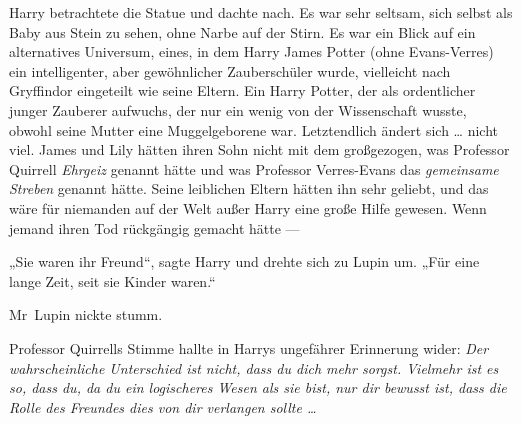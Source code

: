 Harry betrachtete die Statue und dachte nach. Es war sehr seltsam, sich selbst als Baby aus Stein zu sehen, ohne Narbe auf der Stirn. Es war ein Blick auf ein alternatives Universum, eines, in dem Harry James Potter (ohne Evans-Verres) ein intelligenter, aber gewöhnlicher Zauberschüler wurde, vielleicht nach Gryffindor eingeteilt wie seine Eltern. Ein Harry Potter, der als ordentlicher junger Zauberer aufwuchs, der nur ein wenig von der Wissenschaft wusste, obwohl seine Mutter eine Muggelgeborene war. Letztendlich ändert sich … nicht viel. James und Lily hätten ihren Sohn nicht mit dem großgezogen, was Professor Quirrell \emph{Ehrgeiz} genannt hätte und was Professor Verres-Evans das \emph{gemeinsame Streben} genannt hätte. Seine leiblichen Eltern hätten ihn sehr geliebt, und das wäre für niemanden auf der Welt außer Harry eine große Hilfe gewesen. Wenn jemand ihren Tod rückgängig gemacht hätte —

„Sie waren ihr Freund“, sagte Harry und drehte sich zu Lupin um.
„Für eine lange Zeit, seit sie Kinder waren.“

Mr~Lupin nickte stumm.

Professor Quirrells Stimme hallte in Harrys ungefährer Erinnerung wider: \emph{Der wahrscheinliche Unterschied ist nicht, dass du dich mehr sorgst. Vielmehr ist es so, dass du, da du ein logischeres Wesen als sie bist, nur dir bewusst ist, dass die Rolle des Freundes dies von dir verlangen sollte …}

